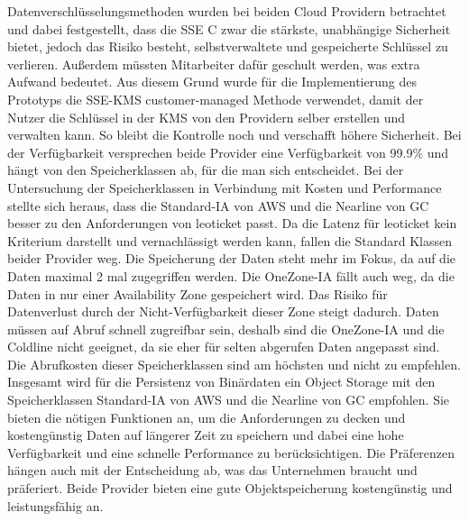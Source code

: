  Datenverschlüsselungsmethoden wurden bei beiden Cloud Providern betrachtet und dabei festgestellt, dass die SSE C zwar die stärkste, unabhängige Sicherheit bietet, jedoch das Risiko besteht, selbstverwaltete und gespeicherte Schlüssel zu verlieren. Außerdem müssten Mitarbeiter dafür geschult werden, was extra Aufwand bedeutet. Aus diesem Grund wurde für die Implementierung des Prototyps die SSE-KMS customer-managed Methode verwendet, damit der Nutzer die Schlüssel in der KMS von den Providern selber erstellen und verwalten kann. So bleibt die Kontrolle noch und verschafft höhere Sicherheit. Bei der Verfügbarkeit versprechen beide Provider eine Verfügbarkeit von 99.9\% und hängt von den Speicherklassen ab, für die man sich entscheidet. Bei der Untersuchung der Speicherklassen in Verbindung mit Kosten und Performance stellte sich heraus, dass die Standard-IA von AWS und die Nearline von GC besser zu den Anforderungen von leoticket passt. Da die Latenz für leoticket kein Kriterium darstellt und vernachlässigt werden kann, fallen die Standard Klassen beider Provider weg. Die Speicherung der Daten steht mehr im Fokus, da auf die Daten maximal 2 mal zugegriffen werden. Die OneZone-IA fällt auch weg, da die Daten in nur einer Availability Zone gespeichert wird. Das Risiko für Datenverlust durch der Nicht-Verfügbarkeit dieser Zone steigt dadurch. Daten müssen auf Abruf schnell zugreifbar sein, deshalb sind die OneZone-IA und die Coldline nicht geeignet, da sie eher für selten abgerufen Daten angepasst sind. Die Abrufkosten dieser Speicherklassen sind am höchsten und nicht zu empfehlen.\\

Insgesamt wird für die Persistenz von Binärdaten ein Object Storage mit den Speicherklassen Standard-IA von AWS und die Nearline von GC empfohlen. Sie bieten die nötigen Funktionen an, um die Anforderungen zu decken und kostengünstig Daten auf längerer Zeit zu speichern und dabei eine hohe Verfügbarkeit und eine schnelle Performance zu berücksichtigen. Die Präferenzen hängen auch mit der Entscheidung ab, was das Unternehmen braucht und präferiert. Beide Provider bieten eine gute Objektspeicherung kostengünstig und leistungsfähig an.\\

